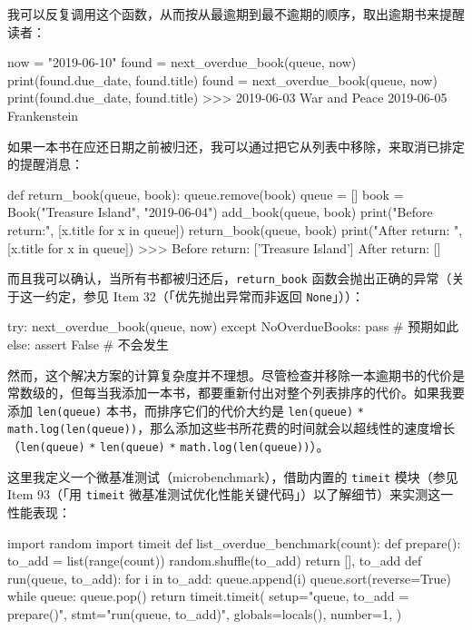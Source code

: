 我可以反复调用这个函数，从而按从最逾期到最不逾期的顺序，取出逾期书来提醒读者：

\begin{codebox}[python]
now = "2019-06-10"
found = next_overdue_book(queue, now)
print(found.due_date, found.title)
found = next_overdue_book(queue, now)
print(found.due_date, found.title)
>>>
2019-06-03 War and Peace
2019-06-05 Frankenstein
\end{codebox}

如果一本书在应还日期之前被归还，我可以通过把它从列表中移除，来取消已排定的提醒消息：

\begin{codebox}[python]
def return_book(queue, book):
    queue.remove(book)
queue = []
book = Book("Treasure Island", "2019-06-04")
add_book(queue, book)
print("Before return:", [x.title for x in queue])
return_book(queue, book)
print("After return: ", [x.title for x in queue])
>>>
Before return: ['Treasure Island']
After return:  []
\end{codebox}

而且我可以确认，当所有书都被归还后，\texttt{return\_book} 函数会抛出正确的异常（关于这一约定，参见 Item 32（「优先抛出异常而非返回 \texttt{None}」））：

\begin{codebox}[python]
try:
    next_overdue_book(queue, now)
except NoOverdueBooks:
    pass          # 预期如此
else:
    assert False  # 不会发生
\end{codebox}

然而，这个解决方案的计算复杂度并不理想。尽管检查并移除一本逾期书的代价是常数级的，但每当我添加一本书，都要重新付出对整个列表排序的代价。如果我要添加 \texttt{len(queue)} 本书，而排序它们的代价大约是 \texttt{len(queue)} \texttt{*} \texttt{math.log(len(queue))}，那么添加这些书所花费的时间就会以超线性的速度增长（\texttt{len(queue)} \texttt{*} \texttt{len(queue)} \texttt{*} \texttt{math.log(len(queue))}）。

这里我定义一个微基准测试（microbenchmark），借助内置的 \texttt{timeit} 模块（参见 Item 93（「用 \texttt{timeit} 微基准测试优化性能关键代码」）以了解细节）来实测这一性能表现：

\begin{codebox}[python]
import random
import timeit
def list_overdue_benchmark(count):
    def prepare():
        to_add = list(range(count))
        random.shuffle(to_add)
        return [], to_add
    def run(queue, to_add):
        for i in to_add:
            queue.append(i)
            queue.sort(reverse=True)
        while queue:
            queue.pop()
    return timeit.timeit(
        setup="queue, to_add = prepare()",
        stmt="run(queue, to_add)",
        globals=locals(),
        number=1,
    )
\end{codebox}

